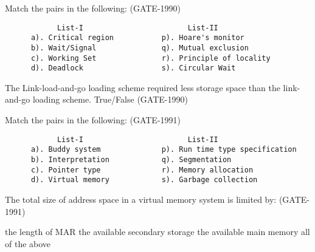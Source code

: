 
\begin{questyle}

  \question Match the pairs in the following: (GATE-1990)

  \begin{lstlisting}
            List-I                        List-II
      a). Critical region           p). Hoare's monitor
      b). Wait/Signal               q). Mutual exclusion
      c). Working Set               r). Principle of locality
      d). Deadlock                  s). Circular Wait

  \end{lstlisting}

\end{questyle}


\begin{questyle}

  \question  The Link-load-and-go loading scheme required less storage space than the link-and-go loading scheme. True/False (GATE-1990)

\end{questyle}


\begin{questyle}

  \question Match the pairs in the following: (GATE-1991)

  \begin{lstlisting}
            List-I                        List-II
      a). Buddy system              p). Run time type specification
      b). Interpretation            q). Segmentation
      c). Pointer type              r). Memory allocation
      d). Virtual memory            s). Garbage collection

  \end{lstlisting}

\end{questyle}


\begin{questyle}

  \question  The total size of address space in a virtual memory system is limited by: (GATE-1991)

  \begin{choices}
    \choice the length of MAR
    \choice the available secondary storage
    \choice the available main memory
    \choice all of the above
  \end{choices}

\end{questyle}

